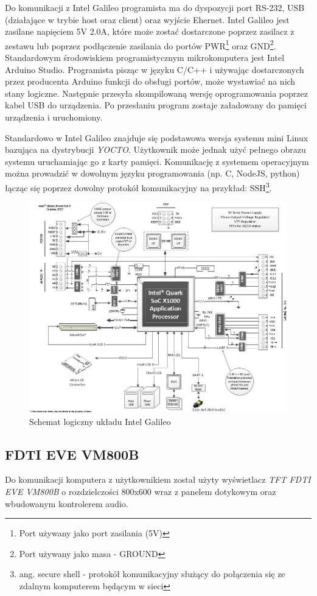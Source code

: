 \documentclass{xmgr}
\begin{document}
Do komunikacji z Intel Galileo programista ma do dyspozycji port RS-232, USB (działające w trybie host oraz client) oraz wyjście Ehernet. Intel Galileo jest zasilane napięciem 5V 2.0A, które może zostać dostarczone poprzez zasilacz z zestawu lub poprzez podłączenie zasilania do portów PWR\footnote{Port używany jako port zasilania (5V)} oraz GND\footnote{Port używany jako masa - GROUND}. Standardowym środowiskiem programistycznym mikrokomputera jest Intel Arduino Studio. Programista pisząc w języku C/C++ i używając dostarczonych przez producenta Arduino funkcji do obsługi portów, może wystawiać na nich stany logiczne. Następnie przesyła skompilowaną wersję oprogramowania poprzez kabel USB do urządzenia. Po przesłaniu program zostaje załadowany do pamięci urządzenia i uruchomiony. 

Standardowo w Intel Galileo znajduje się podstawowa wersja systemu mini Linux bazująca na dystrybucji \emph{YOCTO}. Użytkownik może jednak użyć pełnego obrazu systemu uruchamiając go z karty pamięci. Komunikację z systemem operacyjnym można prowadzić w dowolnym języku programowania (np. C, NodeJS, python) łącząc się poprzez dowolny protokół komunikacyjny na przykład: SSH\footnote{ang. secure shell - protokół komunikacyjny służący do połączenia się ze zdalnym komputerem będącym w sieci}.

\begin{figure}[!h]
    \centering
    \includegraphics[height=0.6\textwidth]{images/IntelGalileoLogicSchematics.jpg}
    \caption{Schemat logiczny układu Intel Galileo\label{IntelGalileoLogicSchematics}}
\end{figure}

\subsection{FDTI EVE VM800B}
Do komunikacji komputera z użytkownikiem został użyty wyświetlacz \emph{TFT FDTI EVE VM800B} o rozdzielczości 800x600 wraz z panelem dotykowym oraz wbudowanym kontrolerem audio. 
\end{document}
